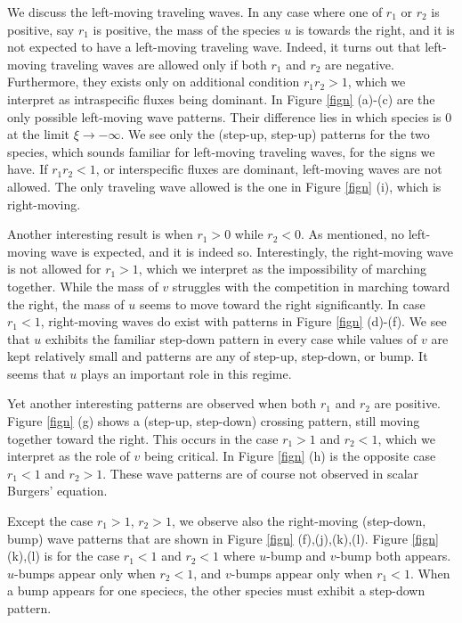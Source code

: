 \documentclass{amsart}
\theoremstyle{definition}
\numberwithin{equation}{section}
\begin{document}
We discuss the left-moving traveling waves. In any case where one of $r_1$ or $r_2$ is positive, say $r_1$ is positive, the mass of the species $u$ is towards the right, and it is not expected to have a left-moving traveling wave. Indeed, it turns out that left-moving traveling waves are allowed only if both $r_1$ and $r_2$ are negative. Furthermore, they exists only on additional condition $r_1r_2>1$, which we interpret as intraspecific fluxes being dominant. In Figure \ref{fign} (a)-(c) are the only possible left-moving wave patterns. Their difference lies in which species is $0$ at the limit $\xi \rightarrow -\infty$. We see only the (step-up, step-up) patterns for the two species, which sounds familiar for left-moving traveling waves, for the signs we have. If $r_1r_2<1$, or interspecific fluxes are dominant, left-moving waves are not allowed. The only traveling wave allowed is the one in Figure \ref{fign} (i), which is right-moving.

Another interesting result is when $r_1>0$ while $r_2<0$. As mentioned, no left-moving wave is expected, and it is indeed so. Interestingly, the right-moving wave is not allowed for $r_1>1$, which we interpret as the impossibility of marching together. While the mass of $v$ struggles with the competition in marching toward the right, the mass of $u$ seems to move toward the right significantly. In case $r_1<1$, right-moving waves do exist with patterns in Figure \ref{fign} (d)-(f). We see that $u$ exhibits the familiar step-down pattern in every case while values of $v$ are kept relatively small and patterns are any of step-up, step-down, or bump. It seems that $u$ plays an important role in this regime.

Yet another interesting patterns are observed when both $r_1$ and $r_2$ are positive. Figure \ref{fign} (g) shows a (step-up, step-down) crossing pattern, still moving together toward the right. This occurs in the case $r_1>1$ and $r_2<1$, which we interpret as the role of $v$ being critical. In Figure \ref{fign} (h) is the opposite case $r_1<1$ and $r_2>1$. These wave patterns are of course not observed in scalar Burgers' equation. 

Except the case $r_1>1$, $r_2>1$, we observe also the right-moving (step-down, bump) wave patterns that are shown in Figure \ref{fign} (f),(j),(k),(l). Figure \ref{fign} (k),(l) is for the case $r_1<1$ and $r_2 <1$ where $u$-bump and $v$-bump both appears. $u$-bumps appear only when $r_2<1$, and $v$-bumps appear only when $r_1<1$. When a bump appears for one speciecs, the other species must exhibit a step-down pattern.
\end{document}
